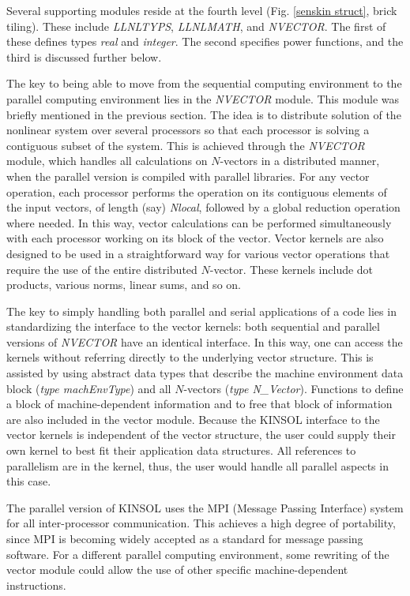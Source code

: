 \documentclass[11pt]{article}
\begin{document}
Several supporting modules reside at the fourth level (Fig.{
}\ref{senskin struct}, brick tiling). These include {\em LLNLTYPS},
{\em LLNLMATH}, and {\em NVECTOR}. The first of these defines types
{\em real} and {\em integer}. The second specifies power functions, and
the third is discussed further below.

The key to being able to move from the sequential computing environment
to the parallel computing environment lies in the {\em NVECTOR} module.
This module was briefly mentioned in the previous section. The idea is
to distribute solution of the nonlinear system over several processors
so that each processor is solving a contiguous subset of the system.
This is achieved through the {\em NVECTOR} module, which handles all
calculations on $N$-vectors in a distributed manner, when the parallel
version is compiled with parallel libraries. For any vector operation,
each processor performs the operation on its contiguous elements of the
input vectors, of length (say) {\em Nlocal}, followed by a global
reduction operation where needed. In this way, vector calculations can
be performed simultaneously with each processor working on its block of
the vector. Vector kernels are also designed to be used in a
straightforward way for various vector operations that require the use
of the entire distributed $N$-vector.  These kernels include dot
products, various norms, linear sums, and so on.

The key to simply handling both parallel and serial applications of a
code lies in standardizing the interface to the vector kernels: both
sequential and parallel versions of {\em NVECTOR} have an identical
interface. In this way, one can access the kernels without referring
directly to the underlying vector structure. This is assisted by using
abstract data types that describe the machine environment data block
({\em type machEnvType}) and all $N$-vectors ({\em type N\_Vector}).
Functions to define a block of machine-dependent information and to
free that block of information are also included in the vector module.
Because the KINSOL interface to the vector kernels is independent of
the vector structure, the user could supply their own kernel to best
fit their application data structures. All references to parallelism
are in the kernel, thus, the user would handle all parallel aspects in
this case.

The parallel version of KINSOL uses the MPI (Message Passing Interface)
system \cite{MPI} for all inter-processor communication. This achieves
a high degree of portability, since MPI is becoming widely accepted as
a standard for message passing software. For a different parallel
computing environment, some rewriting of the vector module could allow
the use of other specific machine-dependent instructions.
\end{document}
